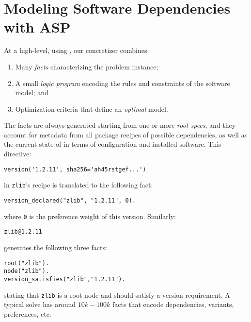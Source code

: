 \section{Modeling Software Dependencies with ASP}
\label{sec:asp-model}

At a high-level, using \clingo, our concretizer combines:
\begin{enumerate}
\item Many \emph{facts} characterizing the problem instance;
\item A small \emph{logic program} encoding the rules and constraints of the software model; and
\item Optimization criteria that define an {\it optimal} model.
\end{enumerate}
The facts are always generated starting from one or more \emph{root specs}, and they
account for metadata from all package recipes of possible dependencies, as well as
the current state of \spack{} in terms of configuration and installed software. This
directive:
%
\begin{verbatim}
version('1.2.11', sha256='ah45rstgef...')
\end{verbatim}
%
in \texttt{zlib}'s recipe is translated to the following fact:
%
\begin{verbatim}
version_declared("zlib", "1.2.11", 0).
\end{verbatim}
%
where {\tt 0} is the preference weight of this version. Similarly:
%
\begin{verbatim}
zlib@1.2.11
\end{verbatim}
%
generates the following three facts:
%
\begin{verbatim}
root("zlib").
node("zlib").
version_satisfies("zlib","1.2.11").
\end{verbatim}
%
stating that \texttt{zlib} is a root node and should satisfy a version requirement. A
typical solve has around $10k-100k$ facts that encode dependencies, variants,
preferences, etc.

